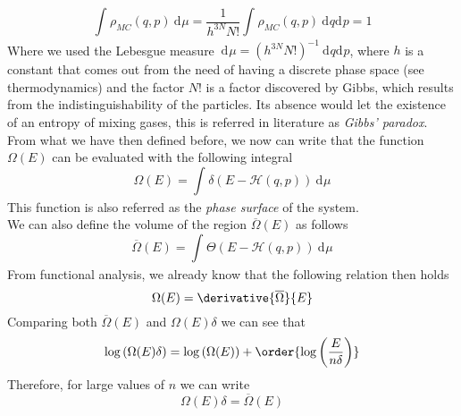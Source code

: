 \documentclass[a4paper, 11pt]{book}
\newcommand{\1}{\opr{\mathds{1}}}
\newcommand{\diff}[2][]{\ \mathrm{d}^{#1}#2}
\newcommand{\ddiff}[3][]{\ \mathrm{d}^{#1}#2\mathrm{d}^{#1}#3}
\newcommand{\ham}{\mathcal{H}}
\newcommand{\cc}[1]{\overline{#1}}
\theoremstyle{plain}
\begin{document}
		\begin{equation}
			\int_{}^{}\rho_{MC}(q,p)\diff{\mu}=\frac{1}{h^{3N}N!}\int_{}^{}\rho_{MC}(q,p)\ddiff{q}{p}=1
			\label{eq:rhonormalization}
		\end{equation}
		Where we used the Lebesgue measure $\diff{\mu}=(h^{3N}N!)^{-1}\ddiff{q}{p}$, where $h$ is a constant that comes out from the need of having a discrete phase space (see thermodynamics) and the factor $N!$ is a factor discovered by Gibbs, which results from the indistinguishability of the particles. Its absence would let the existence of an entropy of mixing gases, this is referred in literature as \textit{Gibbs' paradox}.\\
		From what we have then defined before, we now can write that the function $\Omega(E)$ can be evaluated with the following integral
		\begin{equation}
			\Omega(E)=\int_{}^{}\delta\left( E-\ham(q,p) \right)\diff{\mu}
			\label{eq:omegaedirectcalculus}
		\end{equation}
		This function is also referred as the \textit{phase surface} of the system.\\
		We can also define the volume of the region $\cc{\Omega}(E)$ as follows
		\begin{equation}
			\cc{\Omega}(E)=\int_{}^{}\Theta\left( E-\ham(q,p) \right)\diff{\mu}
			\label{eq:phasevolume}
		\end{equation}
		From functional analysis, we already know that the following relation then holds
		\begin{equation}
			\Omega(E)=\derivative{\cc{\Omega}}{E}
			\label{eq:omegaomegabarrel}
		\end{equation}
		Comparing both $\cc{\Omega}(E)$ and $\Omega(E)\delta$ we can see that
		\begin{equation*}
			\log\left( \Omega(E)\delta \right)=\log\left( \Omega(E) \right)+\order{\log\left( \frac{E}{n\delta} \right)}
		\end{equation*}
		Therefore, for large values of $n$ we can write
		\begin{equation}
			\Omega(E)\delta=\cc{\Omega}(E)
			\label{eq:ccomegaomegauguagliance}
		\end{equation}
\end{document}
